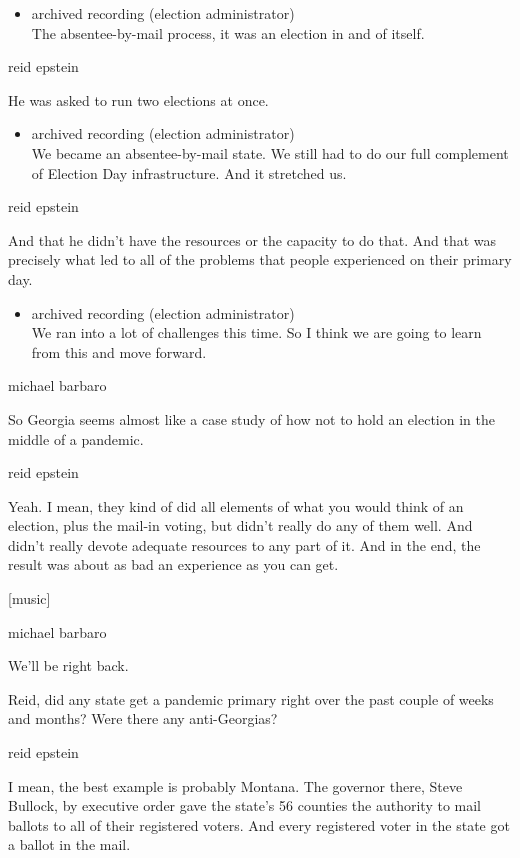 \begin{itemize}
\tightlist
\item
  archived recording (election administrator)\\
  The absentee-by-mail process, it was an election in and of itself.
\end{itemize}

reid epstein

He was asked to run two elections at once.

\begin{itemize}
\tightlist
\item
  archived recording (election administrator)\\
  We became an absentee-by-mail state. We still had to do our full
  complement of Election Day infrastructure. And it stretched us.
\end{itemize}

reid epstein

And that he didn't have the resources or the capacity to do that. And
that was precisely what led to all of the problems that people
experienced on their primary day.

\begin{itemize}
\tightlist
\item
  archived recording (election administrator)\\
  We ran into a lot of challenges this time. So I think we are going to
  learn from this and move forward.
\end{itemize}

michael barbaro

So Georgia seems almost like a case study of how not to hold an election
in the middle of a pandemic.

reid epstein

Yeah. I mean, they kind of did all elements of what you would think of
an election, plus the mail-in voting, but didn't really do any of them
well. And didn't really devote adequate resources to any part of it. And
in the end, the result was about as bad an experience as you can get.

{[}music{]}

michael barbaro

We'll be right back.

Reid, did any state get a pandemic primary right over the past couple of
weeks and months? Were there any anti-Georgias?

reid epstein

I mean, the best example is probably Montana. The governor there, Steve
Bullock, by executive order gave the state's 56 counties the authority
to mail ballots to all of their registered voters. And every registered
voter in the state got a ballot in the mail.


